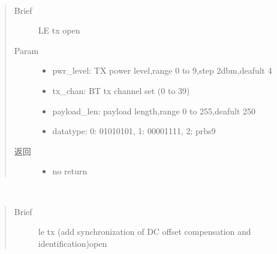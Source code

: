 \documentclass[letterpaper,10pt,english]{sphinxhowto}
\begin{document}
\begin{fulllineitems}
\begin{fulllineitems}
\begin{quote}
\begin{description}
\begin{itemize}
\end{itemize}


\end{description}\end{quote}

\end{fulllineitems}


\begin{fulllineitems}
\label{\detokenize{rfapi/index:bt_api.BTAPI.fcc_le_tx}}~\begin{quote}\begin{description}
\item[{Brief}] \leavevmode
LE tx open

\item[{Param}] \leavevmode\begin{itemize}
\item {} 
pwr\_level: TX power level,range 0 to 9,step 2dbm,deafult 4

\item {} 
tx\_chan: BT tx channel set (0 to 39)

\item {} 
payload\_len: payload length,range 0 to 255,deafult 250

\item {} 
datatype: 0: 01010101, 1: 00001111, 2: prbs9

\end{itemize}

\item[{返回}] \leavevmode
\begin{itemize}
\item {} 
no return

\end{itemize}


\end{description}\end{quote}

\end{fulllineitems}


\begin{fulllineitems}
\label{\detokenize{rfapi/index:bt_api.BTAPI.fcc_le_tx_syncw}}~\begin{quote}\begin{description}
\item[{Brief}] \leavevmode
le tx (add synchronization of DC offset compensation and identification)open


\end{description}
\end{quote}
\end{fulllineitems}
\end{fulllineitems}
\end{document}

